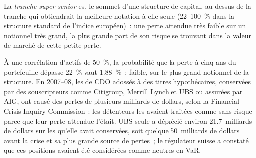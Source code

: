 \begin{omfigure}

\label{fig:rc:portfolio-credit:deltas}
\end{omfigure}

\begin{definition}\label{def:rc:portfolio-credit:ss}
La \emph{tranche super senior} est le sommet d'une structure de capital,
au-dessus de la tranche qui obtiendrait la meilleure notation à elle seule (22--100~\% dans la
structure standard de l'indice européen)~: une perte attendue très faible sur un notionnel très grand,
la plus grande part de son risque se trouvant dans la valeur de marché de cette petite perte.
\end{definition}

\begin{remark}\label{rem:rc:portfolio-credit:ss}
À une corrélation d'actifs de 50~\%, la probabilité que la perte à cinq ans du portefeuille dépasse 22~\% vaut
1.88~\%~: faible, sur le plus grand notionnel de la structure. En 2007--08, les 
de CDO adossés à des titres hypothécaires, conservées par des souscripteurs comme
Citigroup, Merrill Lynch et UBS ou assurées par AIG, ont causé des pertes de plusieurs milliards de dollars,
selon la Financial Crisis Inquiry Commission~: les détenteurs les avaient traitées comme
sans risque parce que leur perte attendue l'était. UBS seule a déprécié environ 21.7~milliards de dollars sur
les  qu'elle avait conservées, soit quelque 50~milliards de dollars avant la crise et sa plus grande source de
pertes~; le régulateur suisse a constaté que ces positions avaient été considérées comme neutres en VaR.
\end{remark}

